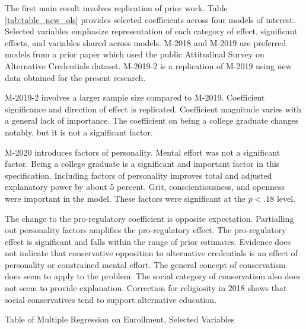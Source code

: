 \documentclass[review]{elsarticle}
\begin{document}
The first main result involves replication of prior work.
Table \ref{tab:table_new_ols} provides selected coefficients across four models of interest.
Selected variables emphasize representation of each category of effect,
significant effects,
and variables shared across models.
M-2018 and M-2019 are preferred models from a prior paper which used the public Attitudinal Survey on Alternative Credentials dataset\cite{vandivier2020preliminary}.
M-2019-2 is a replication of M-2019 using new data obtained for the present research.

M-2019-2 involves a larger sample size compared to M-2019.
Coefficient significance and direction of effect is replicated.
Coefficient magnitude varies with a general lack of importance.
The coefficient on being a college graduate changes notably, but it is not a significant factor.

M-2020 introduces factors of personality.
Mental effort was not a significant factor.
Being a college graduate is a significant and important factor in this specification.
Including factors of personality improves total and adjusted explanatory power by about 5 percent.
Grit, conscientiousness, and openness were important in the model.
These factors were significant at the $p<.18$ level.

The change to the pro-regulatory coefficient is opposite expectation.
Partialling out personality factors amplifies the pro-regulatory effect.
The pro-regulatory effect is significant and falls within the range of prior estimates.
Evidence does not indicate that conservative opposition to alternative credentials is an effect of personality or constrained mental effort.
The general concept of conservatism does seem to apply to the problem.
The social category of conservatism also does not seem to provide explanation.
Correction for religiosity in 2018 shows that social conservatives tend to support alternative education.

\begin{table}
    \caption{Table of Multiple Regression on Enrollment, Selected Variables}
    \resizebox{\columnwidth}{!}{
        
    }
    \label{tab:table_new_ols}
\end{table}
\end{document}
